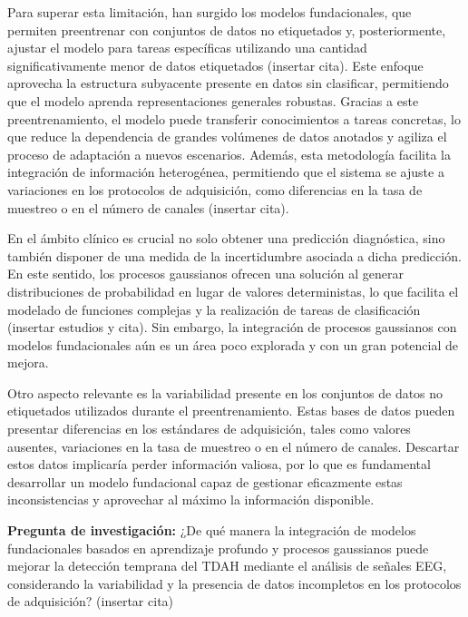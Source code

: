 Para superar esta limitación, han surgido los modelos fundacionales, que permiten preentrenar con conjuntos de datos no etiquetados y, posteriormente, ajustar el modelo para tareas específicas utilizando una cantidad significativamente menor de datos etiquetados (insertar cita). Este enfoque aprovecha la estructura subyacente presente en datos sin clasificar, permitiendo que el modelo aprenda representaciones generales robustas. Gracias a este preentrenamiento, el modelo puede transferir conocimientos a tareas concretas, lo que reduce la dependencia de grandes volúmenes de datos anotados y agiliza el proceso de adaptación a nuevos escenarios. Además, esta metodología facilita la integración de información heterogénea, permitiendo que el sistema se ajuste a variaciones en los protocolos de adquisición, como diferencias en la tasa de muestreo o en el número de canales (insertar cita).

En el ámbito clínico es crucial no solo obtener una predicción diagnóstica, sino también disponer de una medida de la incertidumbre asociada a dicha predicción. En este sentido, los procesos gaussianos ofrecen una solución al generar distribuciones de probabilidad en lugar de valores deterministas, lo que facilita el modelado de funciones complejas y la realización de tareas de clasificación (insertar estudios y cita). Sin embargo, la integración de procesos gaussianos con modelos fundacionales aún es un área poco explorada y con un gran potencial de mejora.

Otro aspecto relevante es la variabilidad presente en los conjuntos de datos no etiquetados utilizados durante el preentrenamiento. Estas bases de datos pueden presentar diferencias en los estándares de adquisición, tales como valores ausentes, variaciones en la tasa de muestreo o en el número de canales. Descartar estos datos implicaría perder información valiosa, por lo que es fundamental desarrollar un modelo fundacional capaz de gestionar eficazmente estas inconsistencias y aprovechar al máximo la información disponible.

\textbf{Pregunta de investigación:}  
¿De qué manera la integración de modelos fundacionales basados en aprendizaje profundo y procesos gaussianos puede mejorar la detección temprana del TDAH mediante el análisis de señales EEG, considerando la variabilidad y la presencia de datos incompletos en los protocolos de adquisición? (insertar cita)
